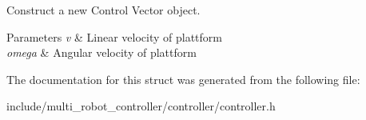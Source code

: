 Construct a new Control Vector object. 


\begin{DoxyParams}{Parameters}
{\em v} & Linear velocity of plattform \\
\hline
{\em omega} & Angular velocity of plattform \\
\hline
\end{DoxyParams}


The documentation for this struct was generated from the following file\+:\begin{DoxyCompactItemize}
\item 
include/multi\+\_\+robot\+\_\+controller/controller/controller.\+h\end{DoxyCompactItemize}

